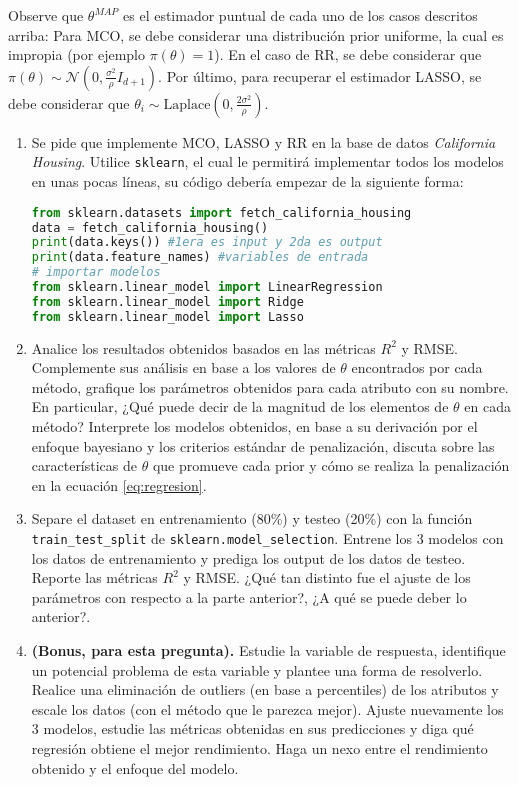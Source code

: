 \documentclass[letterpaper,11pt]{article}
\theoremstyle{plain}
\theoremstyle{definition}
\newcommand{\1}{\mathbbm{1}}
\begin{document}
\begin{enumerate}
Observe que $\theta^{MAP}$ es el estimador puntual de cada uno de los casos descritos arriba: Para MCO, se debe considerar una distribución prior uniforme, la cual es impropia (por ejemplo $\pi(\theta)=1$). En el caso de RR, se debe considerar que $\pi(\theta) \sim\mathcal{N}(0,\frac{\sigma^2}{\rho} I_{d+1} )$. Por último, para recuperar el estimador LASSO, se debe considerar que $\theta_i\sim \text{Laplace} (0,\frac{2\sigma^2}{\rho})$.\\


\begin{enumerate}
    \item Se pide que implemente MCO, LASSO y RR en la base de datos \textit{California Housing}.  Utilice \texttt{sklearn}, el cual le permitirá implementar todos los modelos en unas pocas líneas, su código debería empezar de la siguiente forma:

\begin{lstlisting}[language=Python]
from sklearn.datasets import fetch_california_housing
data = fetch_california_housing()
print(data.keys()) #1era es input y 2da es output
print(data.feature_names) #variables de entrada
# importar modelos
from sklearn.linear_model import LinearRegression
from sklearn.linear_model import Ridge
from sklearn.linear_model import Lasso
\end{lstlisting}

\item Analice los resultados obtenidos basados en las métricas $R^2$ y RMSE. Complemente sus análisis en base a los valores de $\theta$ encontrados por cada método, grafique los parámetros obtenidos para cada atributo con su nombre. En particular, ¿Qué puede decir de la magnitud de los elementos de $\theta$ en cada método? Interprete los modelos obtenidos, en base a su derivación por el enfoque bayesiano y los criterios estándar de penalización, discuta sobre las características de $\theta$ que promueve cada prior y cómo se realiza la penalización en la ecuación  \eqref{eq:regresion}.

\item Separe el dataset en entrenamiento (80\%) y testeo (20\%) con la función \texttt{train\_test\_split} de  \texttt{sklearn.model\_selection}. Entrene los 3 modelos con los datos de entrenamiento y prediga los output de los datos de testeo. Reporte las métricas $R^2$ y RMSE. ¿Qué tan distinto fue el ajuste de los parámetros con respecto a la parte anterior?, ¿A qué se puede deber lo anterior?.

\item \textbf{(Bonus, para esta pregunta).} Estudie la variable de respuesta, identifique un potencial problema de esta variable y plantee una forma de resolverlo. Realice una eliminación de outliers (en base a percentiles) de los atributos y escale los datos (con el método que le parezca mejor). Ajuste nuevamente los 3 modelos, estudie las métricas obtenidas en sus predicciones y diga qué regresión obtiene el mejor rendimiento. Haga un nexo entre el rendimiento obtenido y el enfoque del modelo.  


\end{enumerate}
\end{enumerate}
\end{document}
